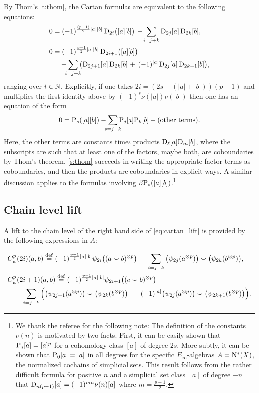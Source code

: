 By Thom's \cref{t:thom}, the Cartan formulas are equivalent to the following equations:
\begin{equation}\label{eq:cartan_lift}
	\begin{split}
		0 &= (-1)^{\frac{(p-1)}{2}\bars{a}\bars{b}} \, \rD_{2i}\big([a][b]\big) \,-\!
		\sum_{i=j+k} \rD_{2j}[a] \, \rD_{2k}[b], \\
		0 &= (-1)^{\frac{p-1}{2}\bars{a}\bars{b}} \, \rD_{2i+1}\big([a][b]\big) \\ & \quad
		-\sum_{\mathclap{i=j+k}} \big(\rD_{2j+1}[a] \, \rD_{2k}[b] \, +\, (-1)^{\bars{a}}\rD_{2j}[a] \, \rD_{2k+1}[b]\big),
	\end{split}
\end{equation}
ranging over $i \in \mathbb{N}$.
Explicitly, if one takes $2i = (2s-(|a|+|b|))(p-1)$ and multiplies the first identity above by $(-1)^s \nu(|a|)\nu(|b|)$ then one has an equation of the form
\[
0 = \rP_s([a][b]) - \sum_{\mathclap{s=j+k}} \rP_j[a] \rP_k[b] - \text{(other terms)}.
\]
Here, the other terms are constants times products $\mathrm{D}_\ell[a] \mathrm{D}_m[b]$, where the subscripts are such that at least one of the factors, maybe both, are coboundaries by Thom’s theorem.
\cref{s:thom} succeeds in writing the appropriate factor terms as coboundaries, and then the products are coboundaries in explicit ways.
A similar discussion applies to the formulas involving $\beta \mathrm{P}_s([a][b])$.\footnote{
We thank the referee for the following note: The definition of the constants $\nu(n)$ is motivated by two facts.
First, it can be easily shown that $\mathrm{P}_s[a] = [a]^p$ for a cohomology class $[a]$ of degree $2s$.
More subtly, it can be shown that $\mathrm{P}_0[a] = [a]$ in all degrees for the specific $E_\infty$-algebras $A = \operatorname{N^{\ast}}(X)$, the normalized cochains of simplicial sets.
This result follows from the rather difficult formula for positive $n$ and a simplicial set class $[a]$ of degree $-n$ that $\mathrm{D}_{n(p-1)}[a] = (-1)^{mn} \nu(n)[a]$ where $m = \frac{p-1}{2}$.\label{fn:mu}
}

\subsection{Chain level lift}

A lift to the chain level of the right hand side of \cref{eq:cartan_lift} is provided by the following expressions in $A$:

\begin{align*}
	&C_\psi^p(2i)(a,b) \defeq (-1)^{\frac{p-1}{2}\bars{a}\bars{b}} \psi_{2i}\big((a \cp b)^{\ot p}\big) \ -
	\sum_{i=j+k}\big(\psi_{2j}(a^{\ot p})\big) \cp \big(\psi_{2k}(b^{\ot p})\big), \\
	&C_\psi^p(2i+1)(a,b) \defeq (-1)^{\frac{p-1}{2}\bars{a}\bars{b}} \psi_{2i+1}\big((a \cp b)^{\ot p}\big) \\
	&\quad -\sum_{i=j+k} \Big(
	\big(\psi_{2j+1}(a^{\ot p})\big) \cp \big(\psi_{2k}(b^{\ot p})\big)\ +\
	(-1)^{\bars{a}}\big(\psi_{2j}(a^{\ot p})\big) \cp \big(\psi_{2k+1}(b^{\ot p})\big)
	\Big).
\end{align*}

